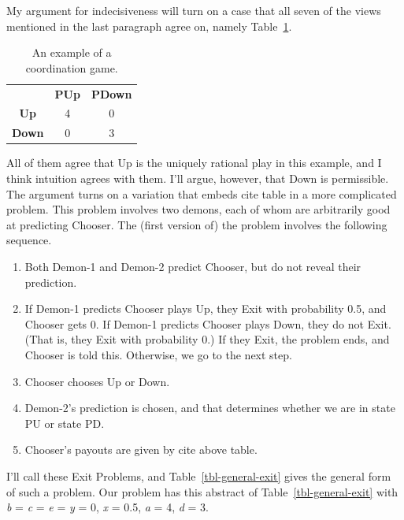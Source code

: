 \documentclass[
  12pt,
  letterpaper,
  DIV=11,
  numbers=noendperiod]{scrreprt}
\providecommand{\tightlist}{%
  \setlength{\itemsep}{0pt}\setlength{\parskip}{0pt}}\usepackage{longtable,booktabs,array}
\begin{document}
My argument for indecisiveness will turn on a case that all seven of the
views mentioned in the last paragraph agree on, namely
Table~\ref{tbl-coord}.

\hypertarget{tbl-coord}{}
\begin{longtable}[]{@{}ccc@{}}
\caption{\label{tbl-coord}An example of a coordination
game.}\tabularnewline
\toprule\noalign{}
\endfirsthead
\endhead
\bottomrule\noalign{}
\endlastfoot
& \textbf{PUp} & \textbf{PDown} \\
\textbf{Up} & 4 & 0 \\
\textbf{Down} & 0 & 3 \\
\end{longtable}

All of them agree that Up is the uniquely rational play in this example,
and I think intuition agrees with them. I'll argue, however, that Down
is permissible. The argument turns on a variation that embeds cite table
in a more complicated problem. This problem involves two demons, each of
whom are arbitrarily good at predicting Chooser. The (first version of)
the problem involves the following sequence.

\begin{enumerate}
\def\labelenumi{\arabic{enumi}.}
\tightlist
\item
  Both Demon-1 and Demon-2 predict Chooser, but do not reveal their
  prediction.
\item
  If Demon-1 predicts Chooser plays Up, they Exit with probability 0.5,
  and Chooser gets 0. If Demon-1 predicts Chooser plays Down, they do
  not Exit. (That is, they Exit with probability 0.) If they Exit, the
  problem ends, and Chooser is told this. Otherwise, we go to the next
  step.
\item
  Chooser chooses Up or Down.
\item
  Demon-2's prediction is chosen, and that determines whether we are in
  state PU or state PD.
\item
  Chooser's payouts are given by cite above table.
\end{enumerate}

I'll call these Exit Problems, and Table~\ref{tbl-general-exit} gives
the general form of such a problem. Our problem has this abstract of
Table~\ref{tbl-general-exit} with \emph{b} = \emph{c} = \emph{e} =
\emph{y} = 0, \emph{x} = 0.5, \emph{a} = 4, \emph{d} = 3.
\end{document}
